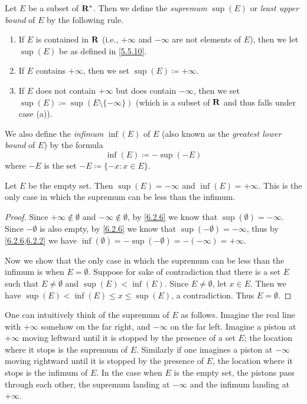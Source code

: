 \begin{definition}\label{6.2.6}
  Let \(E\) be a subset of \(\mathbf{R}^*\).
  Then we define the \emph{supremum} \(\sup(E)\) or \emph{least upper bound} of \(E\) by the following rule.
  \begin{enumerate}
    \item If \(E\) is contained in \(\mathbf{R}\) (i.e., \(+\infty\) and \(-\infty\) are not elements of \(E\)), then we let \(\sup(E)\) be as defined in \cref{5.5.10}.
    \item If \(E\) contains \(+\infty\), then we set \(\sup(E) \coloneqq +\infty\).
    \item If \(E\) does not contain \(+\infty\) but does contain \(-\infty\), then we set \(\sup(E) \coloneqq \sup(E \setminus \{-\infty\})\)
          (which is a subset of \(\mathbf{R}\) and thus falls under case (a)).
  \end{enumerate}
  We also define the \emph{infimum} \(\inf(E)\) of \(E\) (also known as the \emph{greatest lower bound} of \(E\)) by the formula
  \[
    \inf(E) \coloneqq -\sup(-E)
  \]
  where \(-E\) is the set \(-E \coloneqq \{-x : x \in E\}\).
\end{definition}

\setcounter{theorem}{9}
\begin{example}\label{6.2.10}
  Let \(E\) be the empty set.
  Then \(\sup(E) = -\infty\) and \(\inf(E) = +\infty\).
  This is the only case in which the supremum can be less than the infimum.
\end{example}

\begin{proof}
  Since \(+\infty \notin \emptyset\) and \(-\infty \notin \emptyset\), by \cref{6.2.6} we know that \(\sup(\emptyset) = -\infty\).
  Since \(-\emptyset\) is also empty, by \cref{6.2.6} we know that \(\sup(-\emptyset) = -\infty\), thus by \cref{6.2.6,6.2.2} we have \(\inf(\emptyset) = -\sup(-\emptyset) = -(-\infty) = +\infty\).

  Now we show that the only case in which the supremum can be less than the infimum is when \(E = \emptyset\).
  Suppose for sake of contradiction that there is a set \(E\) such that \(E \neq \emptyset\) and \(\sup(E) < \inf(E)\).
  Since \(E \neq \emptyset\), let \(x \in E\).
  Then we have \(\sup(E) < \inf(E) \leq x \leq \sup(E)\), a contradiction.
  Thus \(E = \emptyset\).
\end{proof}

\begin{note}
  One can intuitively think of the supremum of \(E\) as follows.
  Imagine the real line with \(+\infty\) somehow on the far right, and \(-\infty\) on the far left.
  Imagine a piston at \(+\infty\) moving leftward until it is stopped by the presence of a set \(E\);
  the location where it stops is the supremum of \(E\).
  Similarly if one imagines a piston at \(-\infty\) moving rightward until it is stopped by the presence of \(E\), the location where it stops is the infimum of \(E\).
  In the case when \(E\) is the empty set, the pistons pass through each other, the supremum landing at \(-\infty\) and the infimum landing at \(+\infty\).
\end{note}

